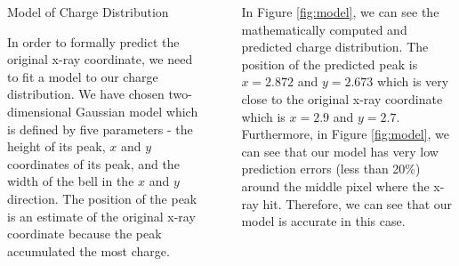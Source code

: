 \documentclass[final]{beamer}
\newlength{\sepwidth}
\newlength{\colwidth}
\newcommand{\separatorcolumn}{\begin{column}{\sepwidth}\end{column}}
\begin{document}
\begin{frame}[t]
\begin{columns}[t]
\begin{column}{\colwidth}
\begin{block}{Model of Charge Distribution}

    In order to formally predict the original x-ray coordinate, we need to fit a model to our charge distribution. We have chosen two-dimensional Gaussian model which is defined by five parameters - the height of its peak, $x$ and $y$ coordinates of its peak, and the width of the bell in the $x$ and $y$ direction. The position of the peak is an estimate of the original x-ray coordinate because the peak accumulated the most charge.

  \end{block}


\end{column}

\separatorcolumn

\begin{column}{\colwidth}
    \vspace{2.2cm}
    
    In Figure \ref{fig:model}, we can see the mathematically computed and predicted charge distribution. The position of the predicted peak is $x=2.872$ and $y=2.673$ which is very close to the original x-ray coordinate which is $x=2.9$ and $y=2.7$. Furthermore, in Figure \ref{fig:model}, we can see that our model has very low prediction errors (less than 20\%) around the middle pixel where the x-ray hit. Therefore, we can see that our model is accurate in this case.
    \vspace{0.8cm}


\end{column}
\end{columns}
\end{frame}
\end{document}
